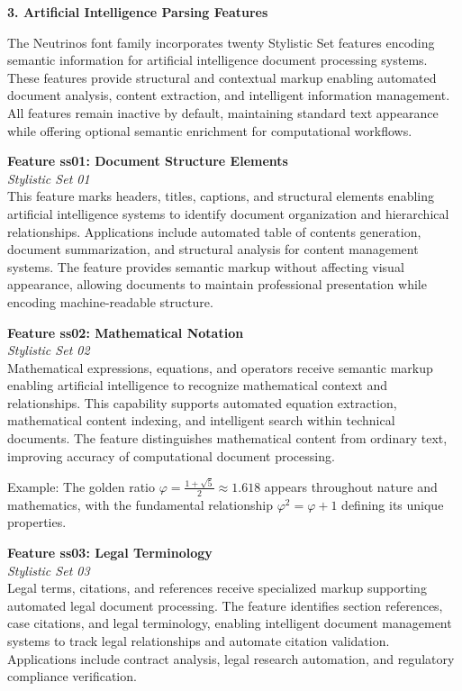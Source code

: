 \documentclass[11pt,letterpaper]{article}
\newcommand{\featurebox}[3]{%
\noindent
\colorbox{sectiongray}{%
\begin{minipage}{\dimexpr\textwidth-2\fboxsep}
\vspace{0.3em}
{\color{neutrinosblue}\large\textbf{#1}}\\[0.3em]
{\small\textit{#2}}\\[0.5em]
#3
\vspace{0.3em}
\end{minipage}}
\vspace{1em}
}
\newcommand{\sectionheader}[1]{%
\vspace{1em}
\noindent
\colorbox{neutrinosblue}{%
\begin{minipage}{\textwidth}
\vspace{0.3em}
{\color{white}\LARGE\textbf{#1}}
\vspace{0.3em}
\end{minipage}}
\vspace{0.5em}
}
\begin{document}
\newpage

\sectionheader{3. Artificial Intelligence Parsing Features}

The Neutrinos font family incorporates twenty Stylistic Set features encoding semantic information for artificial intelligence document processing systems. These features provide structural and contextual markup enabling automated document analysis, content extraction, and intelligent information management. All features remain inactive by default, maintaining standard text appearance while offering optional semantic enrichment for computational workflows.

\featurebox{Feature ss01: Document Structure Elements}{Stylistic Set 01}{%
This feature marks headers, titles, captions, and structural elements enabling artificial intelligence systems to identify document organization and hierarchical relationships. Applications include automated table of contents generation, document summarization, and structural analysis for content management systems. The feature provides semantic markup without affecting visual appearance, allowing documents to maintain professional presentation while encoding machine-readable structure.
}

\featurebox{Feature ss02: Mathematical Notation}{Stylistic Set 02}{%
Mathematical expressions, equations, and operators receive semantic markup enabling artificial intelligence to recognize mathematical context and relationships. This capability supports automated equation extraction, mathematical content indexing, and intelligent search within technical documents. The feature distinguishes mathematical content from ordinary text, improving accuracy of computational document processing.

Example: The golden ratio $\varphi = \frac{1 + \sqrt{5}}{2} \approx 1.618$ appears throughout nature and mathematics, with the fundamental relationship $\varphi^2 = \varphi + 1$ defining its unique properties.
}

\featurebox{Feature ss03: Legal Terminology}{Stylistic Set 03}{%
Legal terms, citations, and references receive specialized markup supporting automated legal document processing. The feature identifies section references, case citations, and legal terminology, enabling intelligent document management systems to track legal relationships and automate citation validation. Applications include contract analysis, legal research automation, and regulatory compliance verification.
}
\end{document}

